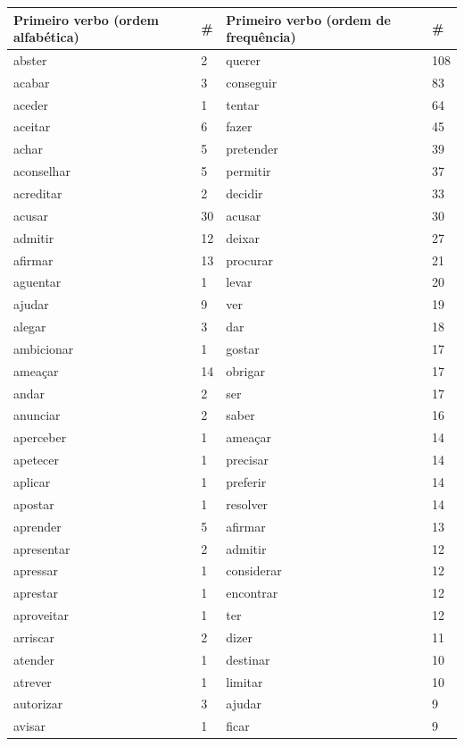 \documentclass[output=paper,colorlinks,citecolor=brown]{langscibook}
\begin{document}
	\begin{longtable}{ p{3cm} | p{1cm} | p{3cm} | p{1cm} }
		\hline
		\textbf{Primeiro verbo (ordem alfabética)} & \textbf{\#} & \textbf{Primeiro verbo (ordem de frequência)} & \textbf{\#} \\\hline
		abster & 2 & querer & 108\\\hline
		acabar & 3 & conseguir & 83\\\hline
		aceder & 1 & tentar & 64\\\hline
		aceitar & 6 & fazer & 45\\\hline
		achar & 5 & pretender & 39\\\hline
		aconselhar & 5 & permitir & 37\\\hline
		acreditar & 2 & decidir & 33\\\hline
		acusar & 30 & acusar & 30\\\hline
		admitir & 12 & deixar & 27\\\hline
		afirmar & 13 & procurar & 21\\\hline
		aguentar & 1 & levar & 20\\\hline
		ajudar & 9 & ver & 19\\\hline
		alegar & 3 & dar & 18\\\hline
		ambicionar & 1 & gostar & 17\\\hline
		ameaçar & 14 & obrigar & 17\\\hline
		andar & 2 & ser & 17\\\hline
		anunciar & 2 & saber & 16\\\hline
		aperceber & 1 & ameaçar & 14\\\hline
		apetecer & 1 & precisar & 14\\\hline
		aplicar & 1 & preferir & 14\\\hline
		apostar & 1 & resolver & 14\\\hline
		aprender & 5 & afirmar & 13\\\hline
		apresentar & 2 & admitir & 12\\\hline
		apressar & 1 & considerar & 12\\\hline
		aprestar & 1 & encontrar & 12\\\hline
		aproveitar & 1 & ter & 12\\\hline
		arriscar & 2 & dizer & 11\\\hline
		atender & 1 & destinar & 10\\\hline
		atrever & 1 & limitar & 10\\\hline
		autorizar & 3 & ajudar & 9\\\hline
		avisar & 1 & ficar & 9\\\hline

\end{longtable}
\end{document}
